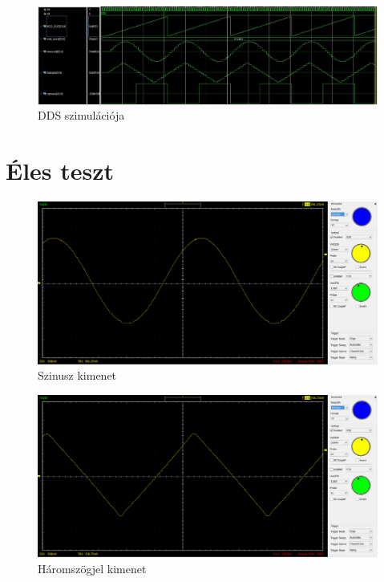 \documentclass[a4paper,11pt]{article}
\begin{document}


\begin{figure}[h!]
	\begin{center}
		\includegraphics[scale=0.5]{simulation.JPG}	
	\end{center}
	\caption{DDS szimulációja}
	\label{a:simulation}
\end{figure}


\section{Éles teszt}

\begin{figure}[h!]
	\begin{center}
		\includegraphics[scale=0.25]{scope_sin.png}	
	\end{center}
	\caption{Szinusz kimenet}
	\label{a:sinout}
\end{figure}

\begin{figure}[h!]
	\begin{center}
		\includegraphics[scale=0.25]{scope_tri.png}	
	\end{center}
	\caption{Háromszögjel kimenet}
	\label{a:triout}
\end{figure}
\end{document}

